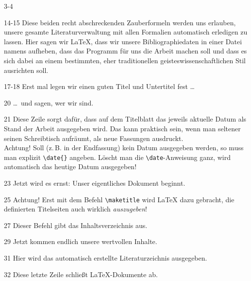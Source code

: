 \begin{labeling}{3-4}
 \item[14-15] Diese beiden recht abschreckenden Zauberformeln werden uns
   erlauben, unsere gesamte Literaturverwaltung mit allen Formalien
   automatisch erledigen zu lassen.  Hier sagen wir \LaTeX{}, dass wir
   unsere Bibliographiedaten in einer Datei namens
    aufheben, dass das Programm
    für uns die Arbeit machen soll und dass es sich dabei
   an einem bestimmten, eher traditionellen geisteswissenschaftlichen Stil
   ausrichten soll.

 \item[17-18] Erst mal legen wir einen guten Titel und Untertitel fest \dots

 \item[20] \dots\ und sagen, wer wir sind.
 
 \item[21] Diese Zeile sorgt dafür, dass auf dem Titelblatt das jeweils
   aktuelle Datum als Stand der Arbeit ausgegeben wird. Das kann praktisch
   sein, wenn man seltener seinen Schreibtisch aufräumt, als neue Fassungen
   ausdruckt.\\ Achtung! Soll (z.\,B. in der Endfassung) kein Datum
   ausgegeben werden, so muss man explizit \lstinline/\date{}/ angeben.
   Löscht man die \lstinline/\date/-Anweisung ganz, wird automatisch das
   heutige Datum ausgegeben!

 \item[23] Jetzt wird es ernst: Unser eigentliches Dokument beginnt.
 
 \item[25] Achtung! Erst mit dem Befehl \lstinline/\maketitle/ wird \LaTeX{}
   dazu gebracht, die definierten Titelseiten auch wirklich
   \emph{auszugeben}!

 \item[27] Dieser Befehl gibt das Inhaltsverzeichnis aus.

 \item[29] Jetzt kommen endlich unsere wertvollen Inhalte.
 
 \item[31] Hier wird das automatisch erstellte Literaturzeichnis ausgegeben.
 
 \item[32] Diese letzte Zeile schließt \LaTeX{}-Dokumente ab.

 \end{labeling}

